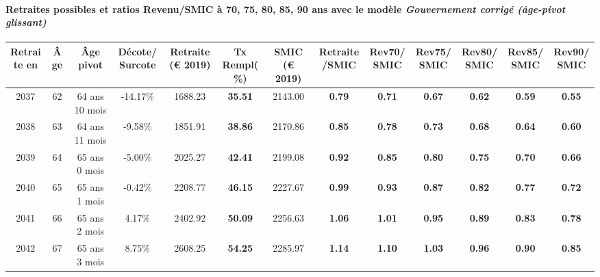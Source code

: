 \paragraph{Retraites possibles et ratios Revenu/SMIC à 70, 75, 80, 85, 90 ans avec le modèle \emph{Gouvernement corrigé (âge-pivot glissant)}}  
 
{ \scriptsize \begin{center} 
\begin{tabular}[htb]{|c|c||c|c||c|c||c||c|c|c|c|c|c|} 
\hline 
 Retraite en &  Âge &  Âge pivot &  Décote/Surcote &  Retraite (\euro{} 2019) &  Tx Rempl(\%) &  SMIC (\euro{} 2019) &  Retraite/SMIC &  Rev70/SMIC &  Rev75/SMIC &  Rev80/SMIC &  Rev85/SMIC &  Rev90/SMIC \\ 
\hline \hline 
 2037 &  62 &  64 ans 10 mois &  -14.17\% &  1688.23 &  {\bf 35.51} &  2143.00 &  {\bf {\color{red} 0.79}} &  {\bf {\color{red} 0.71}} &  {\bf {\color{red} 0.67}} &  {\bf {\color{red} 0.62}} &  {\bf {\color{red} 0.59}} &  {\bf {\color{red} 0.55}} \\ 
\hline 
 2038 &  63 &  64 ans 11 mois &  -9.58\% &  1851.91 &  {\bf 38.86} &  2170.86 &  {\bf {\color{red} 0.85}} &  {\bf {\color{red} 0.78}} &  {\bf {\color{red} 0.73}} &  {\bf {\color{red} 0.68}} &  {\bf {\color{red} 0.64}} &  {\bf {\color{red} 0.60}} \\ 
\hline 
 2039 &  64 &  65 ans 0 mois &  -5.00\% &  2025.27 &  {\bf 42.41} &  2199.08 &  {\bf {\color{red} 0.92}} &  {\bf {\color{red} 0.85}} &  {\bf {\color{red} 0.80}} &  {\bf {\color{red} 0.75}} &  {\bf {\color{red} 0.70}} &  {\bf {\color{red} 0.66}} \\ 
\hline 
 2040 &  65 &  65 ans 1 mois &  -0.42\% &  2208.77 &  {\bf 46.15} &  2227.67 &  {\bf {\color{red} 0.99}} &  {\bf {\color{red} 0.93}} &  {\bf {\color{red} 0.87}} &  {\bf {\color{red} 0.82}} &  {\bf {\color{red} 0.77}} &  {\bf {\color{red} 0.72}} \\ 
\hline 
 2041 &  66 &  65 ans 2 mois &  4.17\% &  2402.92 &  {\bf 50.09} &  2256.63 &  {\bf 1.06} &  {\bf 1.01} &  {\bf {\color{red} 0.95}} &  {\bf {\color{red} 0.89}} &  {\bf {\color{red} 0.83}} &  {\bf {\color{red} 0.78}} \\ 
\hline 
 2042 &  67 &  65 ans 3 mois &  8.75\% &  2608.25 &  {\bf 54.25} &  2285.97 &  {\bf 1.14} &  {\bf 1.10} &  {\bf 1.03} &  {\bf {\color{red} 0.96}} &  {\bf {\color{red} 0.90}} &  {\bf {\color{red} 0.85}} \\ 
\hline 
\hline 
\end{tabular} 
\end{center} } 
